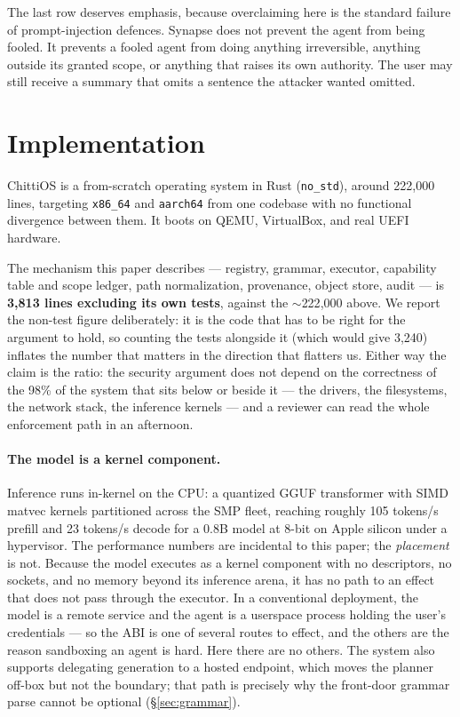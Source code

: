 \documentclass[11pt]{article}
\newcommand{\os}{ChittiOS}
\newcommand{\syn}{Synapse}
\newcommand{\code}[1]{\texttt{#1}}
\begin{document}
The last row deserves emphasis, because overclaiming here is the standard
failure of prompt-injection defences. \syn{} does not prevent the agent from
being fooled. It prevents a fooled agent from doing anything irreversible,
anything outside its granted scope, or anything that raises its own authority.
The user may still receive a summary that omits a sentence the attacker wanted
omitted.

\section{Implementation}
\label{sec:impl}

\os{} is a from-scratch operating system in Rust (\code{no\_std}), around
222{,}000 lines, targeting \code{x86\_64} and \code{aarch64} from one codebase
with no functional divergence between them. It boots on QEMU, VirtualBox, and
real UEFI hardware.

The mechanism this paper describes --- registry, grammar, executor, capability
table and scope ledger, path normalization, provenance, object store, audit ---
is \textbf{3{,}813 lines excluding its own tests}, against the $\sim$222{,}000
above. We report the non-test figure deliberately: it is the
code that has to be right for the argument to hold, so counting the tests
alongside it (which would give 3{,}240) inflates the number that matters
in the direction that flatters us. Either way the claim is the ratio: the
security argument does not depend on the correctness of the 98\% of the system
that sits below or beside it --- the drivers, the filesystems, the network
stack, the inference kernels --- and a reviewer can read the whole enforcement
path in an afternoon.

\paragraph{The model is a kernel component.} Inference runs in-kernel on the
CPU: a quantized GGUF transformer with SIMD matvec kernels partitioned across
the SMP fleet, reaching roughly 105 tokens/s prefill and 23 tokens/s decode for
a 0.8B model at 8-bit on Apple silicon under a hypervisor. The performance
numbers are incidental to this paper; the \emph{placement} is not. Because the
model executes as a kernel component with no descriptors, no sockets, and no
memory beyond its inference arena, it has no path to an effect that does not
pass through the executor. In a conventional deployment, the model is a remote
service and the agent is a userspace process holding the user's credentials ---
so the ABI is one of several routes to effect, and the others are the reason
sandboxing an agent is hard. Here there are no others. The system also
supports delegating generation to a hosted endpoint, which moves the planner
off-box but not the boundary; that path is precisely why the front-door grammar
parse cannot be optional (\S\ref{sec:grammar}).
\end{document}
